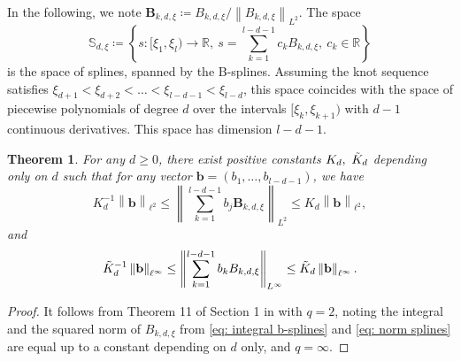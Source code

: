 \documentclass[preprint]{imsart}
\newcommand\norm[1]{\left\lVert#1\right\rVert}
\newtheorem{theorem}{Theorem}[section]
\numberwithin{equation}{section}
\begin{document}
\noindent In the following, we note $\mathbf{B}_{k,d,\xi}\coloneqq B_{k,d,\xi}/ \norm{B_{k,d,\xi}}_{L^2}$. The space
\[\mathbb{S}_{d,\xi} \coloneqq \left\{s\colon [\xi_{1},\xi_{l})\to \mathbb{R},\ s=\sum_{k=1}^{l-d-1}c_k B_{k,d,\xi},\ c_k\in \mathbb{R} \right\}\]
is the space of splines, spanned by the B-splines. Assuming the knot sequence satisfies $\xi_{d+1}<\xi_{d+2}<\dots<\xi_{l-d-1}<\xi_{l-d}$, this space coincides with the space of piecewise polynomials of degree $d$ over the intervals $[\xi_{k},\xi_{k+1})$ with $d-1$ continuous derivatives. This space has dimension $l-d-1$.


\begin{theorem}\label{th: from L2 to l2}
    For any $d\geq 0$, there exist positive constants $K_d,\ \Tilde{K}_d$ depending only on $d$ such that for any vector $\mathbf{b}=(b_1,\dots,b_{l-d-1})$, we have
    \[K_d^{-1}\norm{\mathbf{b}}_{\ell^2}\leq \norm{\sum_{k=1}^{l-d-1} b_j \mathbf{B}_{k,d,\xi}}_{L^2}\leq K_d \norm{\mathbf{b}}_{\ell^2},\]
    and
\[\Tilde{K}_d^{-1}\norm{\mathbf{b}}_{\ell^\infty}\leq \norm{\sum_{k=1}^{l-d-1} b_k B_{k,d,\xi}}_{L^\infty}\leq \Tilde{K}_d \norm{\mathbf{b}}_{\ell^\infty}.\]
\end{theorem}
\begin{proof}
    It follows from Theorem 11 of Section 1 in \cite{LycheSpline} with $q=2$, noting the integral and the squared norm of $B_{k,d,\xi}$ from \eqref{eq: integral b-splines} and \eqref{eq: norm splines} are equal up to a constant depending on $d$ only, and $q=\infty$.
\end{proof}
\end{document}
